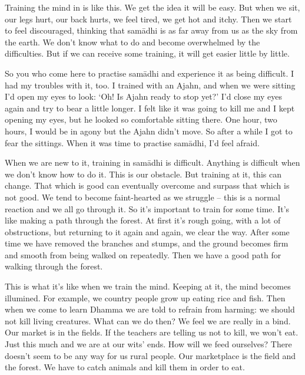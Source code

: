 Training the mind in  is like this. We get the idea it will be easy. But when we sit, our legs hurt, our back hurts, we feel tired, we get hot and itchy. Then we start to feel discouraged, thinking that sam\=adhi is as far away from us as the sky from the earth. We don't know what to do and become overwhelmed by the difficulties. But if we can receive some training, it will get easier little by little.

So you who come here to practise sam\=adhi and experience it as being difficult. I had my troubles with it, too. I trained with an Ajahn, and when we were sitting I'd open my eyes to look: `Oh! Is Ajahn ready to stop yet?' I'd close my eyes again and try to bear a little longer. I felt like it was going to kill me and I kept opening my eyes, but he looked so comfortable sitting there. One hour, two hours, I would be in agony but the Ajahn didn't move. So after a while I got to fear the sittings. When it was time to practise sam\=adhi, I'd feel afraid.

When we are new to it, training in sam\=adhi is difficult. Anything is difficult when we don't know how to do it. This is our obstacle. But \mbox{training} at it, this can change. That which is good can eventually overcome and surpass that which is not good. We tend to become faint-hearted as we struggle -- this is a normal reaction and we all go through it. So it's important to train for some time. It's like making a path through the forest. At first it's rough going, with a lot of obstructions, but returning to it again and again, we clear the way. After some time we have removed the branches and stumps, and the ground becomes firm and smooth from being walked on repeatedly. Then we have a good path for walking through the forest.

This is what it's like when we train the mind. Keeping at it, the mind becomes illumined. For example, we country people grow up eating rice and fish. Then when we come to learn Dhamma we are told to refrain from harming: we should not kill living creatures. What can we do then? We feel we are really in a bind. Our market is in the fields. If the teachers are telling us not to kill, we won't eat. Just this much and we are at our wits' ends. How will we feed ourselves? There doesn't seem to be any way for us rural people. Our marketplace is the field and the forest. We have to catch animals and kill them in order to eat.

